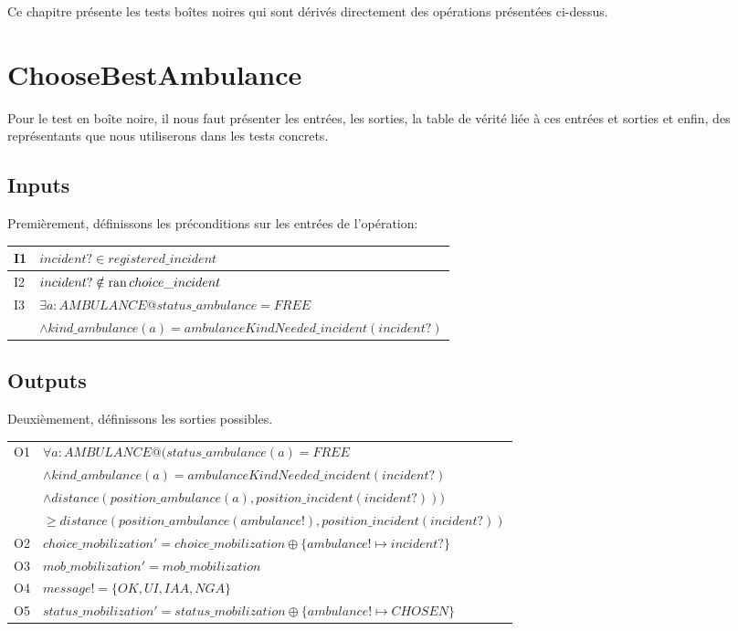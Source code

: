 \documentclass{report}
\begin{document}
Ce chapitre présente les tests boîtes noires qui sont dérivés directement
des opérations présentées ci-dessus.

\section{ChooseBestAmbulance}

Pour le test en boîte noire, il nous faut présenter les entrées,
les sorties, la table de vérité liée à ces entrées et sorties et enfin, 
des représentants que nous utiliserons dans les tests concrets.

\subsection{Inputs}

Premièrement, définissons les préconditions sur les entrées de l'opération:

\noindent\begin{minipage}{\marginparsep+\marginparwidth+\marginparpush+\textwidth}
\begin{tabularx}{\textwidth}{|l|X|}
	\hline
	I1 & $incident? \in registered\_incident$ \\
	\hline
	I2 & $incident? \notin \mathop{\mathrm{ran}} choice\_incident$ \\
	\hline
	I3 & $\exists a: AMBULANCE @ status\_ambulance = FREE$\\&$ \land
  	 kind\_ambulance(a) = ambulanceKindNeeded\_incident(incident?)$ \\
	\hline
\end{tabularx}
\end{minipage}

\subsection{Outputs}

Deuxièmement, définissons les sorties possibles.

\noindent\begin{minipage}{\marginparsep+\marginparwidth+\marginparpush+\textwidth}
\begin{tabularx}{\textwidth}{|l|X|}
	\hline
	O1 & $\forall a: AMBULANCE @ (status\_ambulance(a) = FREE$\\&$\land
  	 kind\_ambulance(a) = ambulanceKindNeeded\_incident(incident?)$\\&$\land
  	 distance(position\_ambulance(a), position\_incident(incident?)))$\\&$
  	 \geq distance(position\_ambulance(ambulance!), position\_incident(incident?))$ \\
  	\hline
  	O2 & $choice\_mobilization' = choice\_mobilization \oplus \{ ambulance! \mapsto incident? \}$ \\
  	\hline
  	O3 & $mob\_mobilization' = mob\_mobilization$ \\
  	\hline
  	O4 & $message! = \{OK, UI, IAA, NGA\}$ \\
	\hline
	O5 & $status\_mobilization' = status\_mobilization \oplus \{ ambulance! \mapsto CHOSEN \}$ \\
  	\hline
\end{tabularx}
\end{minipage}
\end{document}

